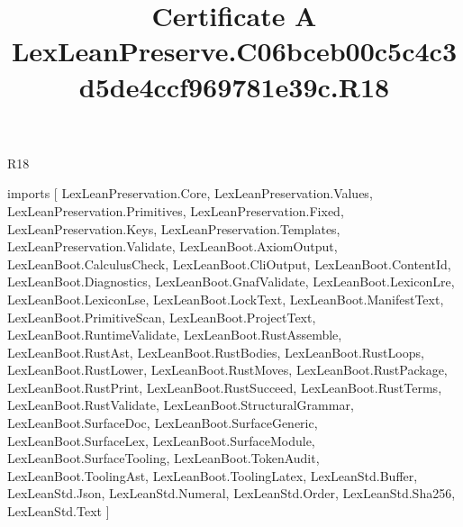 \begin{lexlean}{R18}
\title{Certificate A LexLeanPreserve.C06bceb00c5c4c3d5de4ccf969781e39c.R18}
\begin{coremodule}
imports [
  LexLeanPreservation.Core,
  LexLeanPreservation.Values,
  LexLeanPreservation.Primitives,
  LexLeanPreservation.Fixed,
  LexLeanPreservation.Keys,
  LexLeanPreservation.Templates,
  LexLeanPreservation.Validate,
  LexLeanBoot.AxiomOutput,
  LexLeanBoot.CalculusCheck,
  LexLeanBoot.CliOutput,
  LexLeanBoot.ContentId,
  LexLeanBoot.Diagnostics,
  LexLeanBoot.GnafValidate,
  LexLeanBoot.LexiconLre,
  LexLeanBoot.LexiconLse,
  LexLeanBoot.LockText,
  LexLeanBoot.ManifestText,
  LexLeanBoot.PrimitiveScan,
  LexLeanBoot.ProjectText,
  LexLeanBoot.RuntimeValidate,
  LexLeanBoot.RustAssemble,
  LexLeanBoot.RustAst,
  LexLeanBoot.RustBodies,
  LexLeanBoot.RustLoops,
  LexLeanBoot.RustLower,
  LexLeanBoot.RustMoves,
  LexLeanBoot.RustPackage,
  LexLeanBoot.RustPrint,
  LexLeanBoot.RustSucceed,
  LexLeanBoot.RustTerms,
  LexLeanBoot.RustValidate,
  LexLeanBoot.StructuralGrammar,
  LexLeanBoot.SurfaceDoc,
  LexLeanBoot.SurfaceGeneric,
  LexLeanBoot.SurfaceLex,
  LexLeanBoot.SurfaceModule,
  LexLeanBoot.SurfaceTooling,
  LexLeanBoot.TokenAudit,
  LexLeanBoot.ToolingAst,
  LexLeanBoot.ToolingLatex,
  LexLeanStd.Buffer,
  LexLeanStd.Json,
  LexLeanStd.Numeral,
  LexLeanStd.Order,
  LexLeanStd.Sha256,
  LexLeanStd.Text
]


\end{coremodule}
\end{lexlean}
